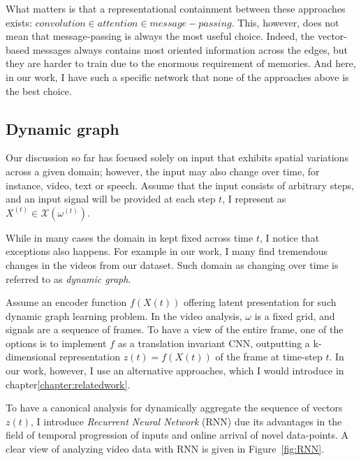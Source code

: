     What matters is that a representational containment between these approaches exists: $convolution \in attention \in message-passing $. This, however, does not mean that message-passing is always the most useful choice. Indeed, the vector-based messages always contains most oriented information across the edges, but they are harder to train due to the enormous requirement of memories. And here, in our work, I have such a specific network that none of the approaches above is the best choice.
 

    \subsection{Dynamic graph}
    Our discussion so far has focused solely on input that exhibits spatial variations across a given domain; however, the input may also change over time, for instance, video, text or speech.
    Assume that the input consists of arbitrary steps, and an input signal will be provided at each step $t$, I represent as $X^{(t)}\in \mathcal{X} (\omega^{(t)})$.

    While in many cases the domain in kept fixed across time $t$, I notice that exceptions also happens. For example in our work, I many find tremendous changes in the videos from our dataset. Such domain as changing over time is referred to as \textit{dynamic graph}\cite{rossi2006temporal,xu2020inductive}.

    Assume an encoder function $f(X(t))$ offering latent presentation for such dynamic graph learning problem. In the video analysis, $\omega$ is a fixed grid, and signals are a sequence of frames. To have a view of the entire frame, one of the options is to implement $f$ as a translation invariant CNN, outputting a k-dimensional representation $z(t)=f(X(t))$  of the frame at time-step $t$. In our work, however, I use an alternative approaches, which I would introduce in chapter\ref{chapter:relatedwork}.

    To have a canonical analysis for dynamically aggregate the sequence of vectors $z(t)$, I introduce \textit{Recurrent Neural Network} (RNN)\cite{schmidt2019recurrent} due its advantages in the field of temporal progression of inputs and online arrival of novel data-points. A clear view of analyzing video data with RNN is given in Figure~\ref{fig:RNN}.

